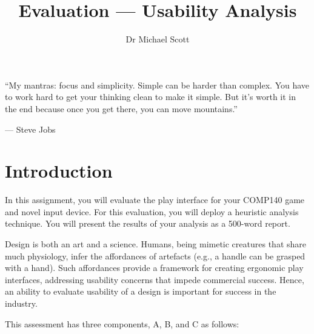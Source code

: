 \documentclass{../fal_assignment}
\title{Evaluation --- Usability Analysis}
\author{Dr Michael Scott}
\begin{document}
\maketitle
\begin{marginquote}
    ``My mantras: focus and simplicity. Simple can be harder than complex. You have to work hard to get your thinking clean to make it simple. But it's worth it in the end because once you get there, you can move mountains.''
    
    --- Steve Jobs
\end{marginquote}
\section*{Introduction}

In this assignment, you will evaluate the play interface for your COMP140 game and novel input device. For this evaluation, you will deploy a heuristic analysis technique. You will present the results of your analysis as a 500-word report.

Design is both an art and a science. Humans, being mimetic creatures that share much physiology, infer the affordances of artefacts (e.g., a handle can be grasped with a hand). Such affordances provide a framework for creating ergonomic play interfaces, addressing usability concerns that impede commercial success. Hence, an ability to evaluate usability of a design is important for success in the industry.

This assessment has three components, A, B, and C as follows:
\end{document}

